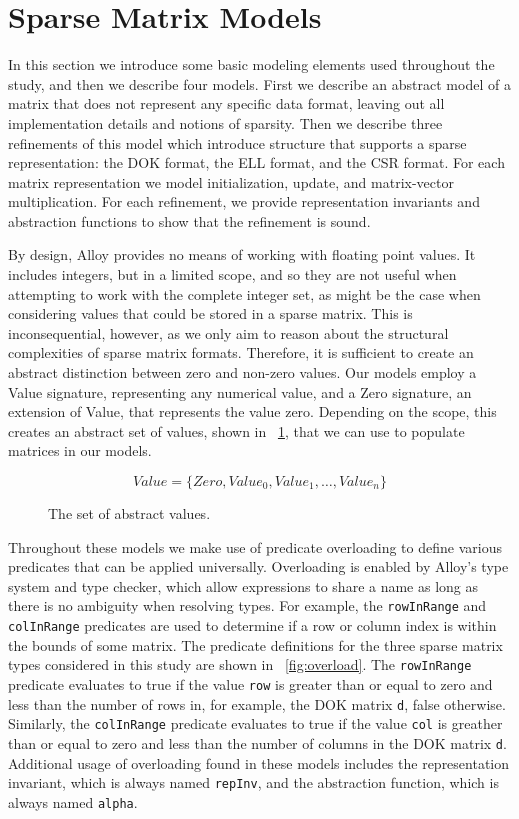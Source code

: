 \section{Sparse Matrix Models}

In this section we introduce some basic modeling elements used throughout the study, and then we describe four models.  First we describe an abstract model of a matrix that does not represent any specific data format, leaving out all implementation details and notions of sparsity. Then we describe three refinements of this model which introduce structure that supports a sparse representation: the DOK format, the ELL format, and the CSR format.  For each matrix representation we model initialization, update, and matrix-vector multiplication.  For each refinement, we provide representation invariants and abstraction functions to show that the refinement is sound.

By design, Alloy provides no means of working with floating point values.  It includes integers, but in a limited scope, and so they are not useful when attempting to work with the complete integer set, as might be the case when considering values that could be stored in a sparse matrix.  This is inconsequential, however, as we only aim to reason about the structural complexities of sparse matrix formats.  Therefore, it is sufficient to create an abstract distinction between zero and non-zero values.  Our models employ a Value signature, representing any numerical value, and a Zero signature, an extension of Value, that represents the value zero.  Depending on the scope, this creates an abstract set of values, shown in \figurename~\ref{fig:values}, that we can use to populate matrices in our models.

\begin{figure}
\begin{displaymath}
Value = \{Zero, Value_0, Value_1, \ldots, Value_n\}
\end{displaymath}
\caption{The set of abstract values.}
\label{fig:values}
\end{figure}

Throughout these models we make use of predicate overloading to define various predicates that can be applied universally.  Overloading is enabled by Alloy's type system and type checker, which allow expressions to share a name as long as there is no ambiguity when resolving types.  For example, the \texttt{rowInRange} and \texttt{colInRange} predicates are used to determine if a row or column index is within the bounds of some matrix.  The predicate definitions for the three sparse matrix types considered in this study are shown in \figurename~\ref{fig:overload}.  The \texttt{rowInRange} predicate evaluates to true if the value \texttt{row} is greater than or equal to zero and less than the number of rows in, for example, the DOK matrix \texttt{d}, false otherwise.  Similarly, the \texttt{colInRange} predicate evaluates to true if the value \texttt{col} is greather than or equal to zero and less than the number of columns in the DOK matrix \texttt{d}.  Additional usage of overloading found in these models includes the representation invariant, which is always named \texttt{repInv}, and the abstraction function, which is always named \texttt{alpha}.

